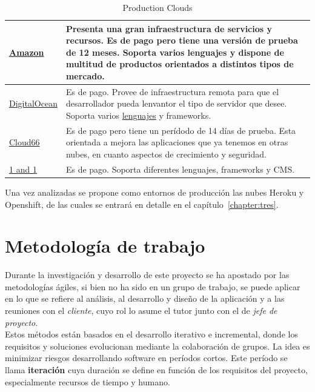 \begin{table}[H]
\begin{tabular}{p{2cm} p{8cm}}
	\hline
	\href{https://aws.amazon.com/es/?nc2=h_lg}{Amazon} & Presenta una gran infraestructura de servicios y recursos. Es de pago pero tiene una versión de prueba de 12 meses. Soporta varios lenguajes y dispone de multitud de productos orientados a distintos tipos de mercado. \\
	\hline
	\href{https://www.digitalocean.com/}{DigitalOcean} & Es de pago. Provee de infraestructura remota para que el desarrollador pueda lenvantor el tipo de servidor que desee. Soporta varios \href{https://www.digitalocean.com/community/}{lenguajes} y frameworks. \\
	\hline
	\href{http://www.cloud66.com/}{Cloud66} & Es de pago pero tiene un perídodo de 14 días de prueba. Esta orientada a mejora las aplicaciones que ya tenemos en otras nubes, en cuanto aspectos de crecimiento y seguridad. \\
	\hline
	\href{http://www.1and1.es/}{1 and 1} & Es de pago. Soporta diferentes lenguajes, frameworks y CMS. \\
	\hline
	\end{tabular}
	\caption{Production Clouds}
	\label{tabla:clouds}
\end{table}

Una vez analizadas se propone como entornos de producción las nubes Heroku y Openshift, de las cuales se entrará en detalle en el capítulo~\ref{chapter:tres}.


\vspace*{0.2in}
\section{Metodología de trabajo}\label{cap.1.3}

\vspace*{0.1in}
Durante la investigación y desarrollo de este proyecto se ha apostado por las metodologías ágiles, si bien no ha sido en un grupo de trabajo, se puede aplicar en lo que se refiere al análisis, al desarrollo y diseño de la aplicación y a las reuniones con el \emph{cliente}, cuyo rol lo asume el tutor junto con el de \emph{jefe de proyecto}. \\

Estos métodos están basados en el desarrollo iterativo e incremental, donde los requisitos y soluciones evolucionan mediante la colaboración de grupos. La idea es minimizar riesgos desarrollando software en períodos cortos. Este período se llama \textbf{iteración} cuya duración se define en función de los requisitos del proyecto, especialmente recursos de tiempo y humano. \\

